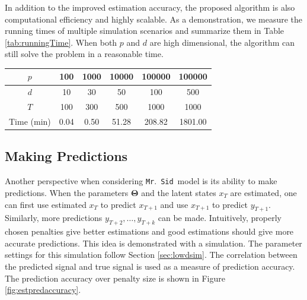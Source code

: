 \documentclass[fleqn]{article}
\let\oldref\ref
\renewcommand{\ref}[1]{(\oldref{#1})}
\newcommand{\mrsid}{{\sc \texttt{Mr}.~\texttt{Sid}}}
\begin{document}
In addition to the improved estimation accuracy, the proposed algorithm is also computational efficiency and highly scalable. As a demonstration, we measure the running times of multiple simulation scenarios and summarize them in Table \oldref{tab:runningTime}. When both $p$ and $d$ are high dimensional, the algorithm can still solve the problem in a reasonable time.
\begin{center}
\captionof{table}{\mrsid~Running Time}
\label{tab:runningTime}
\begin{tabular}{c|ccccc}
\hline\hline
$p$ & 100 & 1000 & 10000 & 100000 & 100000\\
\hline
$d$ & 10 & 30 & 50 & 100 & 500 \\
\hline
$T$ & 100 & 300 & 500 & 1000 & 1000 \\
\hline
Time (min)& 0.04 & 0.50  & 51.28 & 208.82 & 1801.00 \\
\hline\hline
\end{tabular}
\end{center}
\subsection{Making Predictions}
Another perspective when considering \mrsid~model is its ability to make predictions. When the parameters $\mathbf{\Theta}$ and the latent states $x_T$ are estimated, one can first use estimated $x_T$ to predict $x_{T+1}$ and use $x_{T+1}$ to predict $y_{T+1}$. Similarly, more predictions $y_{T+2},\ldots, y_{T+k}$ can be made. Intuitively, properly chosen penalties give better estimations and good estimations should give more accurate predictions. This idea is demonstrated with a simulation. The parameter settings for this simulation follow Section \oldref{sec:lowdsim}. The correlation between the predicted signal and true signal is used as a measure of prediction accuracy. The prediction accuracy over penalty size is shown in Figure \oldref{fig:estpredaccuracy}.


\end{document}
